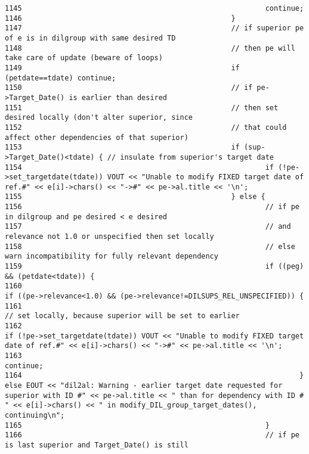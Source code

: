 \begin{verbatim}
1145                                                         continue;
1146                                                 }
1147                                                 // if superior pe of e is in dilgroup with same desired TD
1148                                                 // then pe will take care of update (beware of loops)
1149                                                 if (petdate==tdate) continue;
1150                                                 // if pe->Target_Date() is earlier than desired
1151                                                 // then set desired locally (don't alter superior, since
1152                                                 // that could affect other dependencies of that superior)
1153                                                 if (sup->Target_Date()<tdate) { // insulate from superior's target date
1154                                                         if (!pe->set_targetdate(tdate)) VOUT << "Unable to modify FIXED target date of ref.#" << e[i]->chars() << "->#" << pe->al.title << '\n';
1155                                                 } else {
1156                                                         // if pe in dilgroup and pe desired < e desired
1157                                                         // and relevance not 1.0 or unspecified then set locally
1158                                                         // else warn incompatibility for fully relevant dependency
1159                                                         if ((peg) && (petdate<tdate)) {
1160                                                                 if ((pe->relevance<1.0) && (pe->relevance!=DILSUPS_REL_UNSPECIFIED)) {
1161                                                                         // set locally, because superior will be set to earlier
1162                                                                         if (!pe->set_targetdate(tdate)) VOUT << "Unable to modify FIXED target date of ref.#" << e[i]->chars() << "->#" << pe->al.title << '\n';
1163                                                                         continue;
1164                                                                 } else EOUT << "dil2al: Warning - earlier target date requested for superior with ID #" << pe->al.title << " than for dependency with ID # " << e[i]->chars() << " in modify_DIL_group_target_dates(), continuing\n";
1165                                                         }
1166                                                         // if pe is last superior and Target_Date() is still

\end{verbatim}
